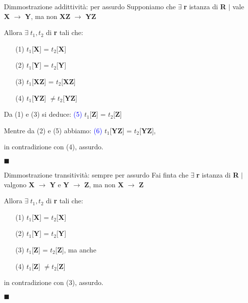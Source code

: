 \documentclass{beamer}
\begin{document}
\begin{frame}{Dimmostrazione addittività: per assurdo}
    Supponiamo che $\exists \;$\textbf{r} istanza di \textbf{R} $|$ vale \textbf{X} $\rightarrow$ \textbf{Y}, ma non \textbf{XZ} $\rightarrow$ \textbf{YZ} \par
    Allora $\exists \; t_1, t_2$ di \textbf{r} tali che:
    \begin{enumerate}
        \item[(1)] $t_1$[\textbf{X}] = $t_2$[\textbf{X}]
        \item[(2)] $t_1$[\textbf{Y}] = $t_2$[\textbf{Y}]
        \item[(3)] $t_1$[\textbf{XZ}] = $t_2$[\textbf{XZ}]
        \item[(4)] $t_1$[\textbf{YZ}] $\neq t_2$[\textbf{YZ}]
    \end{enumerate}
    \vfill
    Da (1) e (3) si deduce: \textcolor{blue}{(5)} $t_1$[\textbf{Z}] = $t_2$[\textbf{Z}] \par
    Mentre da (2) e (5) abbiamo: \textcolor{blue}{(6)} $t_1$[\textbf{YZ}] = $t_2$[\textbf{YZ}],\par
    in contradizione con (4), assurdo.\par
    \raggedleft
    \huge
    $\blacksquare$\hspace{1cm}
\end{frame}

\begin{frame}{Dimmostrazione transitività: sempre per assurdo}
    Fai finta che $\exists \;$\textbf{r} istanza di \textbf{R} $|$ valgono \textbf{X} $\rightarrow$ \textbf{Y} e \textbf{Y} $\rightarrow$ \textbf{Z}, ma non \textbf{X} $\rightarrow$ \textbf{Z} \par
    Allora $\exists \; t_1, t_2$ di \textbf{r} tali che:
    \begin{enumerate}
        \item[(1)] $t_1$[\textbf{X}] = $t_2$[\textbf{X}]
        \item[(2)] $t_1$[\textbf{Y}] = $t_2$[\textbf{Y}]
        \item[(3)] $t_1$[\textbf{Z}] = $t_2$[\textbf{Z}], ma anche
        \item[(4)] $t_1$[\textbf{Z}] $\neq t_2$[\textbf{Z}]
    \end{enumerate}
    in contradizione con (3), assurdo.\par
    \raggedleft\huge
    $\blacksquare$\hspace{1cm}
    
\end{frame}
\end{document}
